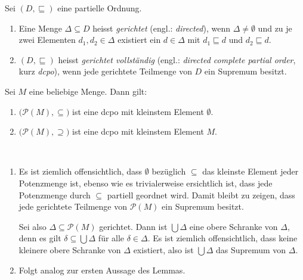 \begin{definition} \label{definition:math:dcpo}
  Sei $(D,\sqsubseteq)$ eine partielle Ordnung.
  \begin{enumerate}
    \item Eine Menge $\Delta \subseteq D$ heisst {\em gerichtet} (engl.: {\em directed}), wenn
          $\Delta \ne \emptyset$ und zu je zwei Elementen $d_1,d_2\in\Delta$ existiert ein
          $d\in\Delta$ mit $d_1\sqsubseteq{d}$ und $d_2\sqsubseteq{d}$.

    \item $(D,\sqsubseteq)$ heisst {\em gerichtet vollst\"andig} (engl.: {\em directed complete
          partial order}, kurz {\em dcpo}), wenn jede gerichtete Teilmenge von $D$ ein
          Supremum besitzt.
  \end{enumerate}
\end{definition}

\begin{lemma} \label{lemma:math:Potenzmengen_sind_dcpos}
  Sei $M$ eine beliebige Menge. Dann gilt:
  \begin{enumerate}
    \item $\bigl(\mathcal{P}(M),\subseteq\bigr)$ ist eine dcpo mit kleinstem Element $\emptyset$.
    \item $\bigl(\mathcal{P}(M),\supseteq\bigr)$ ist eine dcpo mit kleinstem Element $M$.
  \end{enumerate}
\end{lemma}

\begin{beweis} \
  \begin{enumerate}
    \item Es ist ziemlich offensichtlich, dass $\emptyset$ bez\"uglich $\subseteq$ das kleinste
          Element jeder Potenzmenge ist, ebenso wie es trivialerweise ersichtlich ist, dass jede
          Potenzmenge durch $\subseteq$ partiell geordnet wird. Damit bleibt zu zeigen, dass jede
          gerichtete Teilmenge von $\mathcal{P}(M)$ ein Supremum besitzt.

          Sei also $\Delta\subseteq\mathcal{P}(M)$ gerichtet. Dann ist $\bigcup \Delta$ eine
          obere Schranke von $\Delta$, denn es gilt $\delta \subseteq \bigcup \Delta$ f\"ur
          alle $\delta \in \Delta$. Es ist ziemlich offensichtlich, dass keine kleinere
          obere Schranke von $\Delta$ existiert, also ist $\bigcup \Delta$ das Supremum
          von $\Delta$.

    \item Folgt analog zur ersten Aussage des Lemmas.
  \end{enumerate}
\end{beweis}

